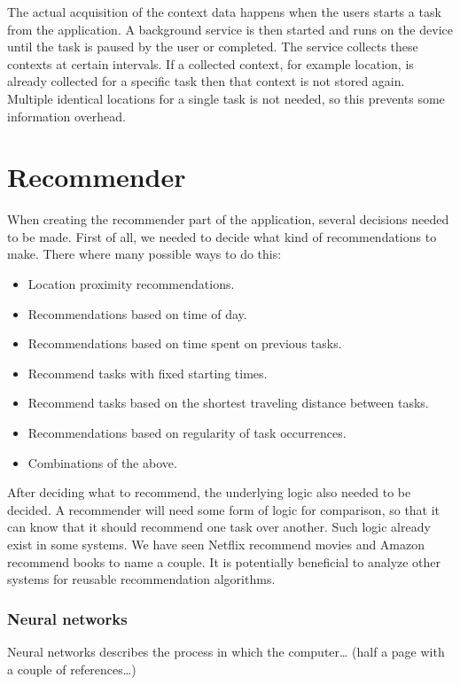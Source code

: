The actual acquisition of the context data happens when the users starts a task from the application. A background service is then started and runs on the device until the task is paused by the user or completed. The service collects these contexts at certain intervals. If a collected context, for example location, is already collected for a specific task then that context is not stored again. Multiple identical locations for a single task is not needed, so this prevents some information overhead.




\section{Recommender}
\label{sec:recommender}

When creating the recommender part of the application, several decisions needed to be made. First of all, we needed to decide what kind of recommendations to make. There where many possible ways to do this:
\begin{itemize}
	\item Location proximity recommendations.
  \item Recommendations based on time of day.
  \item Recommendations based on time spent on previous tasks.
  \item Recommend tasks with fixed starting times.
  \item Recommend tasks based on the shortest traveling distance between tasks.
  \item Recommendations based on regularity of task occurrences.
  \item Combinations of the above.
\end{itemize}

After deciding what to recommend, the underlying logic also needed to be decided. A recommender will need some form of logic for comparison, so that it can know that it should recommend one task over another. Such logic already exist in some systems. We have seen Netflix\cite{netflix} recommend movies and Amazon\cite{amazon} recommend books to name a couple. It is potentially beneficial to analyze other systems for reusable recommendation algorithms.

\subsubsection{Neural networks}
Neural networks describes the process in which the computer\ldots
(half a page with a couple of references\ldots)

